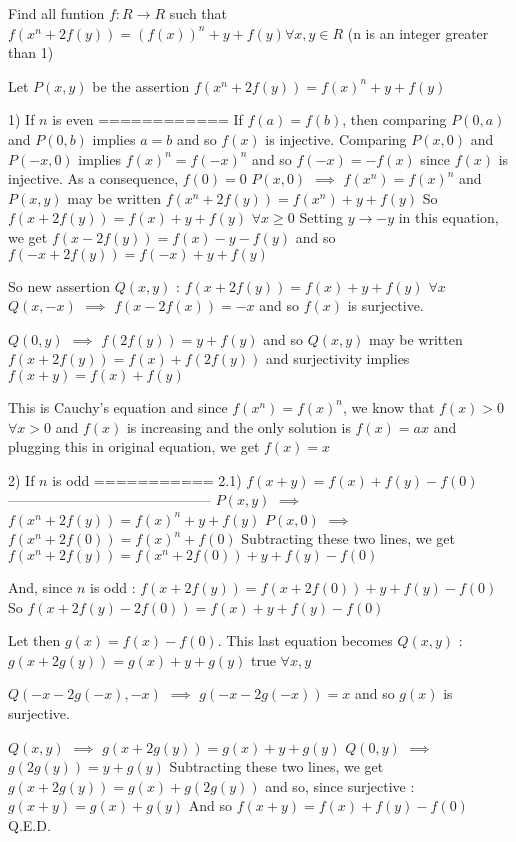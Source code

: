 \begin{solution}
	\begin{tcolorbox}[quote="mathlink"]Find all funtion $f: R\to R$ such that
$f(x^n+2f(y))=(f(x))^n +y+f(y) \forall x, y \in R$
(n is an integer greater than 1)\end{tcolorbox}
Let $P(x,y)$ be the assertion $f(x^n+2f(y))=f(x)^n+y+f(y)$

1) If $n$ is even
============
If $f(a)=f(b)$, then comparing $P(0,a)$ and $P(0,b)$ implies $a=b$ and so $f(x)$ is injective.
Comparing $P(x,0)$ and $P(-x,0)$ implies $f(x)^n=f(-x)^n$ and so $f(-x)=-f(x)$ since $f(x)$ is injective.
As a consequence, $f(0)=0$
$P(x,0)$ $\implies$ $f(x^n)=f(x)^n$ and $P(x,y)$ may be written $f(x^n+2f(y))=f(x^n)+y+f(y)$
So $f(x+2f(y))=f(x)+y+f(y)$ $\forall x\ge 0$
Setting $y\to -y$ in this equation, we get $f(x-2f(y))=f(x)-y-f(y)$ and so $f(-x+2f(y))=f(-x)+y+f(y)$

So new assertion $Q(x,y)$ : $f(x+2f(y))=f(x)+y+f(y)$ $\forall x$
$Q(x,-x)$ $\implies$ $f(x-2f(x))=-x$ and so $f(x)$ is surjective.

$Q(0,y)$ $\implies$ $f(2f(y))=y+f(y)$ and so $Q(x,y)$ may be written $f(x+2f(y))=f(x)+f(2f(y))$ and surjectivity implies $f(x+y)=f(x)+f(y)$

This is Cauchy's equation and since $f(x^n)=f(x)^n$, we know that $f(x)>0$ $\forall x>0$ and $f(x)$ is increasing and the only solution is $f(x)=ax$ and plugging this in original equation, we get $\boxed{f(x)=x}$

2) If $n$ is odd
===========
2.1) $f(x+y)=f(x)+f(y)-f(0)$
--------------------------------------------
$P(x,y)$ $\implies$ $f(x^n+2f(y))=f(x)^n+y+f(y)$
$P(x,0)$ $\implies$ $f(x^n+2f(0))=f(x)^n+f(0)$
Subtracting these two lines, we get $f(x^n+2f(y))=f(x^n+2f(0))+y+f(y)-f(0)$

And, since $n$ is odd : $f(x+2f(y))=f(x+2f(0))+y+f(y)-f(0)$
So $f(x+2f(y)-2f(0))=f(x)+y+f(y)-f(0)$

Let then $g(x)=f(x)-f(0)$. This last equation becomes $Q(x,y)$ : $g(x+2g(y))=g(x)+y+g(y)$ true $\forall x,y$

$Q(-x-2g(-x),-x)$ $\implies$ $g(-x-2g(-x))=x$ and so $g(x)$ is surjective.

$Q(x,y)$ $\implies$ $g(x+2g(y))=g(x)+y+g(y)$
$Q(0,y)$ $\implies$ $g(2g(y))=y+g(y)$
Subtracting these two lines, we get $g(x+2g(y))=g(x)+g(2g(y))$ and so, since surjective : $g(x+y)=g(x)+g(y)$
And so $f(x+y)=f(x)+f(y)-f(0)$
Q.E.D.


\end{solution}
